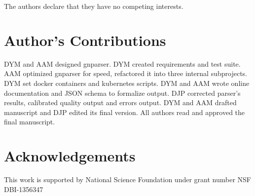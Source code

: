 \documentclass{bmcart}
\begin{document}
The authors declare that they have no competing interests.

\section*{Author's Contributions}

DYM and AAM designed gnparser. DYM created requirements and test suite. AAM
optimized gnparser for speed, refactored it into three internal subprojects.
DYM set docker containers and kubernetes scripts. DYM and AAM wrote online
documentation and JSON schema to formalize output. DJP corrected parser's
results, calibrated quality output and errors output. DYM and AAM drafted
manuscript and DJP edited its final version. All authors read and approved the
final manuscript.

\section*{Acknowledgements}

This work is supported by National Science Foundation under grant number NSF
DBI-1356347



\end{document}

